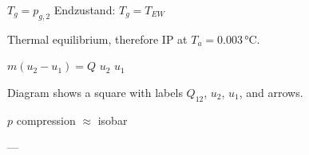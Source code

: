 \( T_g = p_{g,2} \) Endzustand: \( T_g = T_{EW} \)  

Thermal equilibrium, therefore IP at \( T_a = 0.003 \, \text{°C} \).  

\( m (u_2 - u_1) = Q \)  
\( u_2 \)  
\( u_1 \)  

Diagram shows a square with labels \( Q_{12} \), \( u_2 \), \( u_1 \), and arrows.  

\( p \) compression \( \approx \) isobar  

---